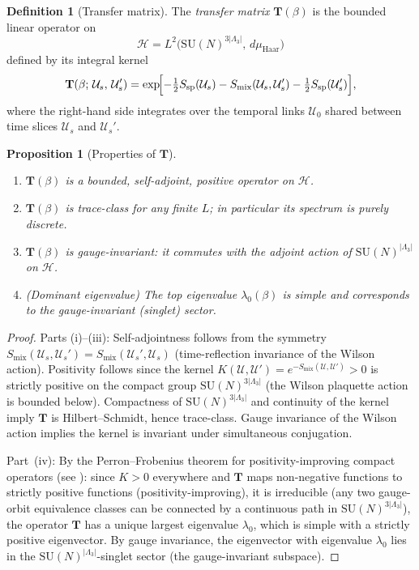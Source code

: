 \documentclass[11pt,a4paper]{amsart}
\newtheorem{proposition}[theorem]{Proposition}
\theoremstyle{definition}
\newtheorem{definition}[theorem]{Definition}
\newcommand{\SU}{\mathrm{SU}}
\begin{document}
\begin{definition}[Transfer matrix]
\label{def:transfer_matrix}
The \emph{transfer matrix} $\mathbf{T}(\beta)$ is the bounded linear operator on
\[
   \mathcal{H} = L^2\!\bigl(\SU(N)^{3|\Lambda_3|},\, d\mu_{\text{Haar}}\bigr)
\]
defined by its integral kernel
\[
   \mathbf{T}(\beta;\, \mathcal{U}_s,\, \mathcal{U}_s')
   = \exp\!\Bigl[-\tfrac{1}{2}S_{\text{sp}}(\mathcal{U}_s)
                 - S_{\text{mix}}(\mathcal{U}_s,\mathcal{U}_s')
                 - \tfrac{1}{2}S_{\text{sp}}(\mathcal{U}_s')\Bigr],
\]
where the right-hand side integrates over the temporal links $\mathcal{U}_0$
shared between time slices $\mathcal{U}_s$ and $\mathcal{U}_s'$.
\end{definition}

\begin{proposition}[Properties of $\mathbf{T}$]
\label{prop:transfer_properties}
\begin{enumerate}[label=(\roman*)]
\item $\mathbf{T}(\beta)$ is a bounded, self-adjoint, positive operator on $\mathcal{H}$.
\item $\mathbf{T}(\beta)$ is trace-class for any finite $L$; in particular its spectrum
      is purely discrete.
\item $\mathbf{T}(\beta)$ is gauge-invariant: it commutes with the adjoint action of
      $\SU(N)^{|\Lambda_3|}$ on $\mathcal{H}$.
\item \emph{(Dominant eigenvalue)} The top eigenvalue $\lambda_0(\beta)$ is simple
      and corresponds to the gauge-invariant (singlet) sector.
\end{enumerate}
\end{proposition}

\begin{proof}
Parts (i)--(iii): Self-adjointness follows from the symmetry
$S_{\text{mix}}(\mathcal{U}_s,\mathcal{U}_s') = S_{\text{mix}}(\mathcal{U}_s',\mathcal{U}_s)$
(time-reflection invariance of the Wilson action).  Positivity follows since the
kernel $K(\mathcal{U},\mathcal{U}') = e^{-S_{\text{mix}}(\mathcal{U},\mathcal{U}')} > 0$
is strictly positive on the compact group $\SU(N)^{3|\Lambda_3|}$
(the Wilson plaquette action is bounded below).
Compactness of $\SU(N)^{3|\Lambda_3|}$ and continuity of the kernel
imply $\mathbf{T}$ is Hilbert--Schmidt, hence trace-class.
Gauge invariance of the Wilson action implies the kernel is invariant
under simultaneous conjugation.

Part~(iv): By the Perron--Frobenius theorem for positivity-improving compact operators
(see \cite[Thm.~XIII.44]{ReedSimon4}): since $K>0$ everywhere and $\mathbf{T}$ maps
non-negative functions to strictly positive functions (positivity-improving), it is irreducible
(any two gauge-orbit equivalence classes can be connected by a continuous path
in $\SU(N)^{3|\Lambda_3|}$), the operator $\mathbf{T}$ has a unique largest
eigenvalue $\lambda_0$, which is simple with a strictly positive eigenvector.
By gauge invariance, the eigenvector with eigenvalue $\lambda_0$ lies in the
$\SU(N)^{|\Lambda_3|}$-singlet sector (the gauge-invariant subspace).
\end{proof}
\end{document}
